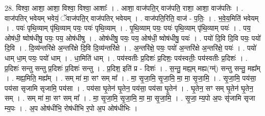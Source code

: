 \documentclass[17pt]{extarticle}
\begin{document}
28. विश्वा॒ आशा॒ आशा॒ विश्वा॒ विश्वा॒ आशाः᳚ । . आशा॒ वाज॑पति॒र् वाज॑पति॒ राशा॒ आशा॒ वाज॑पतिः । . वाज॑पतिर् भवेयम् भवेयं॒ ॅवाज॑पति॒र् वाज॑पतिर् भवेयम् । . वाज॑पति॒रिति॒ वाज॑ - प॒तिः॒ । . भ॒वे॒य॒मिति॑ भवेयम् । . पयः॑ पृथि॒व्याम् पृ॑थि॒व्याम् पयः॒ पयः॑ पृथि॒व्याम् । . पृ॒थि॒व्याम् पयः॒ पयः॑ पृथि॒व्याम् पृ॑थि॒व्याम् पयः॑ । . पय॒ ओष॑धी॒ ष्वोष॑धीषु॒ पयः॒ पय॒ ओष॑धीषु । . ओष॑धीषु॒ पयः॒ पय॒ ओष॑धी॒ ष्वोष॑धीषु॒ पयः॑ । . पयो॑ दि॒वि दि॒वि पयः॒ पयो॑ दि॒वि । . दि॒व्य॑न्तरि॑क्षे अ॒न्तरि॑क्षे दि॒वि दि॒व्य॑न्तरि॑क्षे । . अ॒न्तरि॑क्षे॒ पयः॒ पयो॑ अ॒न्तरि॑क्षे अ॒न्तरि॑क्षे॒ पयः॑ । . पयो॑ धाम् धा॒म् पयः॒ पयो॑ धाम् । . धा॒मिति॑ धाम् । . पय॑स्वतीः प्र॒दिशः॑ प्र॒दिशः॒ पय॑स्वतीः॒ पय॑स्वतीः प्र॒दिशः॑ । . प्र॒दिशः॑ सन्तु सन्तु प्र॒दिशः॑ प्र॒दिशः॑ सन्तु । . प्र॒दिश॒ इति॑ प्र - दिशः॑ । . स॒न्तु॒ मह्य॒म् मह्य(ग्म्॑) सन्तु सन्तु॒ मह्य᳚म् । . मह्य॒मिति॒ मह्य᳚म् । . सम् मा॑ मा॒ सꣳ सम् मा᳚ । . मा॒ सृ॒जा॒मि॒ सृ॒जा॒मि॒ मा॒ मा॒ सृ॒जा॒मि॒ । . सृ॒जा॒मि॒ पय॑सा॒ पय॑सा सृजामि सृजामि॒ पय॑सा । . पय॑सा घृ॒तेन॑ घृ॒तेन॒ पय॑सा॒ पय॑सा घृ॒तेन॑ । . घृ॒तेन॒ सꣳ सम् घृ॒तेन॑ घृ॒तेन॒ सम् । . सम् मा॑ मा॒ सꣳ सम् मा᳚ । . मा॒ सृ॒जा॒मि॒ सृ॒जा॒मि॒ मा॒ मा॒ सृ॒जा॒मि॒ । . सृ॒जा॒ म्य॒पो अ॒पः सृ॑जामि सृजा म्य॒पः । . अ॒प ओष॑धीभि॒ रोष॑धीभि र॒पो अ॒प ओष॑धीभिः । \newline
\end{document}
